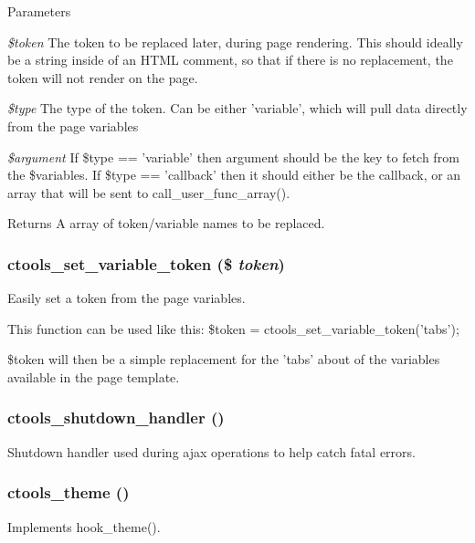 \begin{DoxyParams}{Parameters}
\item[{\em \$token}]The token to be replaced later, during page rendering. This should ideally be a string inside of an HTML comment, so that if there is no replacement, the token will not render on the page. \item[{\em \$type}]The type of the token. Can be either 'variable', which will pull data directly from the page variables \item[{\em \$argument}]If \$type == 'variable' then argument should be the key to fetch from the \$variables. If \$type == 'callback' then it should either be the callback, or an array that will be sent to call\_\-user\_\-func\_\-array().\end{DoxyParams}
\begin{DoxyReturn}{Returns}
A array of token/variable names to be replaced. 
\end{DoxyReturn}
\hypertarget{ctools_8module_af50c57385ec72ff698a4292ce5b9cecd}{
\subsubsection[{ctools\_\-set\_\-variable\_\-token}]{\setlength{\rightskip}{0pt plus 5cm}ctools\_\-set\_\-variable\_\-token (\$ {\em token})}}
\label{ctools_8module_af50c57385ec72ff698a4292ce5b9cecd}
Easily set a token from the page variables.

This function can be used like this: \$token = ctools\_\-set\_\-variable\_\-token('tabs');

\$token will then be a simple replacement for the 'tabs' about of the variables available in the page template. \hypertarget{ctools_8module_aa5bb2f555630d9f5eb2b695c2e3eb68c}{
\subsubsection[{ctools\_\-shutdown\_\-handler}]{\setlength{\rightskip}{0pt plus 5cm}ctools\_\-shutdown\_\-handler ()}}
\label{ctools_8module_aa5bb2f555630d9f5eb2b695c2e3eb68c}
Shutdown handler used during ajax operations to help catch fatal errors. \hypertarget{ctools_8module_aec20ea7c40c247f48eddb4073aa2a447}{
\subsubsection[{ctools\_\-theme}]{\setlength{\rightskip}{0pt plus 5cm}ctools\_\-theme ()}}
\label{ctools_8module_aec20ea7c40c247f48eddb4073aa2a447}
Implements hook\_\-theme(). 